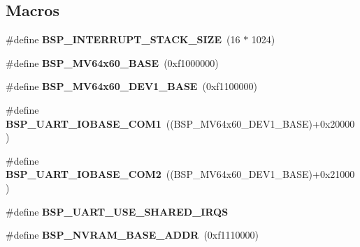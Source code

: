\subsection*{Macros}
\begin{DoxyCompactItemize}
\item 
\mbox{\label{group__RTEMSBSPsPowerPCBeatnik_gaae9597381ef6e8194012ad0c6168cf79}} 
\#define {\bfseries B\+S\+P\+\_\+\+I\+N\+T\+E\+R\+R\+U\+P\+T\+\_\+\+S\+T\+A\+C\+K\+\_\+\+S\+I\+ZE}~(16 $\ast$ 1024)
\item 
\mbox{\label{group__RTEMSBSPsPowerPCBeatnik_gab052d2cfcd2a3d92c51705e791dc9fd5}} 
\#define {\bfseries B\+S\+P\+\_\+\+M\+V64x60\+\_\+\+B\+A\+SE}~(0xf1000000)
\item 
\mbox{\label{group__RTEMSBSPsPowerPCBeatnik_ga2a09e621b55ff05dd5b7d72a042718a7}} 
\#define {\bfseries B\+S\+P\+\_\+\+M\+V64x60\+\_\+\+D\+E\+V1\+\_\+\+B\+A\+SE}~(0xf1100000)
\item 
\mbox{\label{group__RTEMSBSPsPowerPCBeatnik_gab259f83c40cdf929716d93a04b510006}} 
\#define {\bfseries B\+S\+P\+\_\+\+U\+A\+R\+T\+\_\+\+I\+O\+B\+A\+S\+E\+\_\+\+C\+O\+M1}~((B\+S\+P\+\_\+\+M\+V64x60\+\_\+\+D\+E\+V1\+\_\+\+B\+A\+SE)+0x20000)
\item 
\mbox{\label{group__RTEMSBSPsPowerPCBeatnik_ga2475131339f3941237ce2f311cdc4492}} 
\#define {\bfseries B\+S\+P\+\_\+\+U\+A\+R\+T\+\_\+\+I\+O\+B\+A\+S\+E\+\_\+\+C\+O\+M2}~((B\+S\+P\+\_\+\+M\+V64x60\+\_\+\+D\+E\+V1\+\_\+\+B\+A\+SE)+0x21000)
\item 
\mbox{\label{group__RTEMSBSPsPowerPCBeatnik_ga99866d8b01bba3d166dfd16f4484a3da}} 
\#define {\bfseries B\+S\+P\+\_\+\+U\+A\+R\+T\+\_\+\+U\+S\+E\+\_\+\+S\+H\+A\+R\+E\+D\+\_\+\+I\+R\+QS}
\item 
\mbox{\label{group__RTEMSBSPsPowerPCBeatnik_ga3609a9801d78442aec42a447d34a5af0}} 
\#define {\bfseries B\+S\+P\+\_\+\+N\+V\+R\+A\+M\+\_\+\+B\+A\+S\+E\+\_\+\+A\+D\+DR}~(0xf1110000)
\item 
\mbox{\label{group__RTEMSBSPsPowerPCBeatnik_ga7e5b61fffab5ff89f4697d3a932b935e}} 

\end{DoxyCompactItemize}
